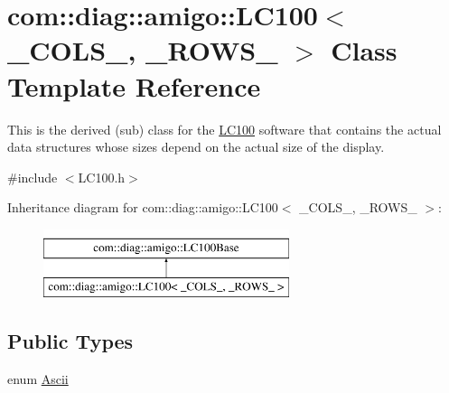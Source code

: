 \hypertarget{classcom_1_1diag_1_1amigo_1_1LC100}{
\section{com::diag::amigo::LC100$<$ \_\-COLS\_\-, \_\-ROWS\_\- $>$ Class Template Reference}
\label{classcom_1_1diag_1_1amigo_1_1LC100}
}


This is the derived (sub) class for the \hyperlink{classcom_1_1diag_1_1amigo_1_1LC100}{LC100} software that contains the actual data structures whose sizes depend on the actual size of the display.  




{\ttfamily \#include $<$LC100.h$>$}

Inheritance diagram for com::diag::amigo::LC100$<$ \_\-COLS\_\-, \_\-ROWS\_\- $>$:\begin{figure}[H]
\begin{center}
\leavevmode
\includegraphics[height=2cm]{classcom_1_1diag_1_1amigo_1_1LC100}
\end{center}
\end{figure}
\subsection*{Public Types}
\begin{DoxyCompactItemize}
\item 
enum \hyperlink{classcom_1_1diag_1_1amigo_1_1LC100Base_af03411f6b7c62f305335952ea45b3d51}{Ascii} 
\end{DoxyCompactItemize}
